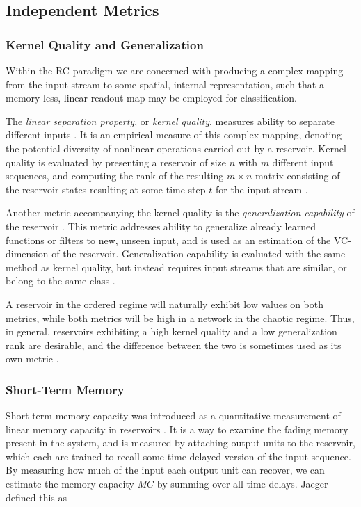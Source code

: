 \subsection{Independent Metrics}

\subsubsection{Kernel Quality and Generalization}

Within the RC paradigm we are concerned with producing a complex mapping from
the input stream to some spatial, internal representation, such that a
memory-less, linear readout map may be employed for classification.

The \textit{linear separation property}, or \textit{kernel quality}, measures
ability to separate different inputs \cite{legenstein_edge_2007}. It is an
empirical measure of this complex mapping, denoting the potential diversity of
nonlinear operations carried out by a reservoir. Kernel quality is evaluated by
presenting a reservoir of size $n$ with $m$ different input sequences, and
computing the rank of the resulting $m\times n$ matrix consisting of the
reservoir states resulting at some time step $t$ for the input stream
\cite{busing_connectivity_2010}.

Another metric accompanying the kernel quality is the \textit{generalization
capability} of the reservoir \cite{legenstein_edge_2007}. This metric addresses
ability to generalize already learned functions or filters to new, unseen input,
and is used as an estimation of the VC-dimension of the
reservoir. Generalization capability is evaluated with the same method as kernel
quality, but instead requires input streams that are similar, or belong to the
same class \cite{busing_connectivity_2010}.

A reservoir in the ordered regime will naturally exhibit low values on both
metrics, while both metrics will be high in a network in the chaotic
regime. Thus, in general, reservoirs exhibiting a high kernel quality and a low
generalization rank are desirable, and the difference between the two is
sometimes used as its own metric \cite{busing_connectivity_2010}.

\subsubsection{Short-Term Memory}

Short-term memory capacity was introduced as a quantitative measurement of
linear memory capacity in reservoirs \cite{jaeger_short_2002}. It is a way to
examine the fading memory present in the system, and is measured by attaching
output units to the reservoir, which each are trained to recall some time
delayed version of the input sequence. By measuring how much of the input each
output unit can recover, we can estimate the memory capacity $MC$ by summing
over all time delays. Jaeger defined this as

